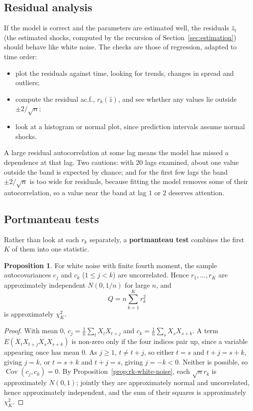 \documentclass[11pt,a4paper]{article}
\theoremstyle{definition}
\newtheorem{prop}[thm]{Proposition}
\DeclareMathOperator{\Cov}{Cov}
\begin{document}
\subsection{Residual analysis}
If the model is correct and the parameters are estimated well, the residuals $\hat z_t$ (the estimated shocks, computed
by the recursion of Section~\ref{sec:estimation}) should behave like white noise. The checks are those of regression,
adapted to time order:
\begin{itemize}
\item plot the residuals against time, looking for trends, changes in spread and outliers;
\item compute the residual ac.f., $r_k(\hat z)$, and see whether any values lie outside $\pm2/\sqrt n$;
\item look at a histogram or normal plot, since prediction intervals assume normal shocks.
\end{itemize}
A large residual autocorrelation at some lag means the model has missed a dependence at that lag. Two
cautions: with $20$ lags examined, about one value outside the band is expected by chance; and for the first few
lags the band $\pm2/\sqrt n$ is too wide for residuals, because fitting the model removes some of their
autocorrelation, so a value near the band at lag $1$ or $2$ deserves attention.

\subsection{Portmanteau tests}
Rather than look at each $r_k$ separately, a \textbf{portmanteau test} combines the first $K$ of them into one statistic.

\begin{prop}\label{prop:rk-uncorrelated}
For white noise with finite fourth moment, the sample autocovariances $c_j$ and $c_k$ ($1 \le j < k$) are uncorrelated. Hence
$r_1, \dots, r_K$ are approximately independent $N(0, 1/n)$ for large $n$, and
\[
Q = n\sum_{k=1}^Kr_k^2
\]
is approximately $\chi^2_K$.
\end{prop}

\begin{proof}
With mean $0$, $c_j = \frac1n\sum_tX_tX_{t+j}$ and $c_k = \frac1n\sum_sX_sX_{s+k}$. A term $E(X_tX_{t+j}X_sX_{s+k})$ is non-zero only if the four indices pair up,
since a variable appearing once has mean $0$. As $j \ge 1$, $t \ne t + j$, so either $t = s$ and $t + j = s + k$, giving $j = k$, or $t = s + k$
and $t + j = s$, giving $j = -k < 0$. Neither is possible, so $\Cov(c_j, c_k) = 0$. By Proposition~\ref{prop:rk-white-noise}, each $\sqrt nr_k$ is
approximately $N(0, 1)$; jointly they are approximately normal and uncorrelated, hence approximately independent,
and the sum of their squares is approximately $\chi^2_K$.
\end{proof}
\end{document}

